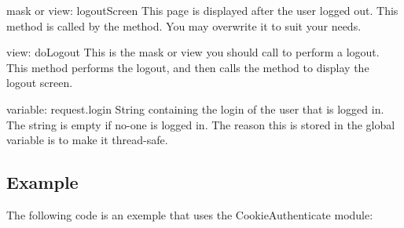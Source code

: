 \begin{funcdesc}{mask or view: logoutScreen}{}
This page is displayed after the user logged out. This method is called by the  method.
You may overwrite it to suit your needs.
\end{funcdesc}

\begin{funcdesc}{view: doLogout}{}
This is the mask or view you should call to perform a logout. This method performs the logout, and then calls
the  method to display the logout screen.
\end{funcdesc}

\begin{memberdesc}{variable: request.login}
String containing the login of the user that is logged in. The string is empty if no-one is logged in. The reason this is stored in the  global variable is to make it thread-safe.
\end{memberdesc}

\begin{seealso}
\end{seealso}


\subsection{Example}
The following code is an exemple that uses the CookieAuthenticate module:

